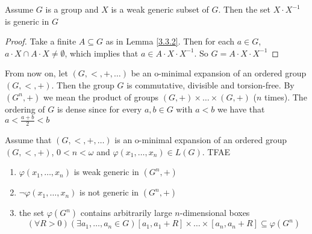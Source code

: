 \documentclass[11pt]{article}
\begin{document}
\begin{corollary}[]
Assume \(G\) is a group and \(X\) is a weak generic subset of \(G\). Then the set \(X\cdot X^{-1}\)
is generic in \(G\)
\end{corollary}

\begin{proof}
Take a finite \(A\subseteq G\) as in Lemma \ref{3.3.2}. Then for each \(a\in G\), \(a\cdot X\cap A\cdot X\neq\emptyset\), which
implies that \(a\in A\cdot X\cdot X^{-1}\). So \(G=A\cdot X\cdot X^{-1}\)
\end{proof}

From now on, let \((G,<,+,\dots)\) be an o-minimal expansion of an ordered group \((G,<,+)\). Then
the group \(G\) is commutative, divisible and torsion-free. By \((G^n,+)\) we mean the product of
groups \((G,+)\times\dots\times(G,+)\) (\(n\) times). The ordering of \(G\) is dense since for
every \(a,b\in G\) with \(a<b\) we have that \(a<\frac{a+b}{2}<b\)

\begin{theorem}[]
\label{3.3.4}
Assume that \((G,<,+,\dots)\) is an o-minimal expansion of an ordered group \((G,<,+)\), \(0<n<\omega\)
and \(\varphi(x_1,\dots,x_n)\in L(G)\). TFAE
\begin{enumerate}
\item \(\varphi(x_1,\dots,x_n)\) is weak generic in \((G^n,+)\)
\item \(\neg\varphi(x_1,\dots,x_n)\) is not generic in \((G^n,+)\)
\item the set \(\varphi(G^n)\) contains arbitrarily large \(n\)-dimensional boxes
\begin{equation*}
(\forall R>0)(\exists a_1,\dots,a_n\in G)[a_1,a_1+R]\times\dots\times[a_n,a_n+R]\subseteq\varphi(G^n)
\end{equation*}
\end{enumerate}
\end{theorem}
\end{document}
